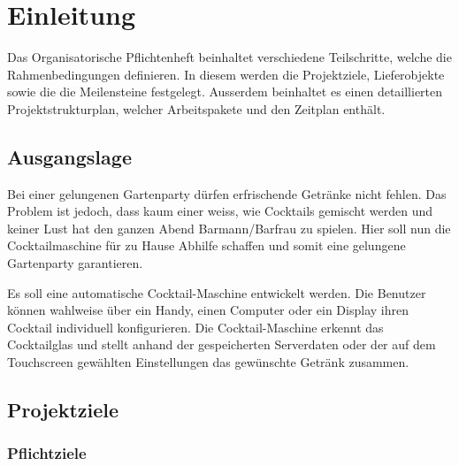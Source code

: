 \clearpage
\section{Einleitung}\label{sec:Einleitung}
Das Organisatorische Pflichtenheft beinhaltet verschiedene Teilschritte, welche die Rahmenbedingungen definieren. In diesem werden die Projektziele, Lieferobjekte sowie die die Meilensteine festgelegt. Ausserdem beinhaltet es einen detaillierten Projektstrukturplan, welcher Arbeitspakete und den Zeitplan enthält.

\subsection{Ausgangslage}\label{subsec:Ausgangslage}

Bei einer gelungenen Gartenparty dürfen erfrischende Getränke nicht fehlen. Das Problem ist jedoch, dass kaum einer weiss, wie Cocktails gemischt werden und keiner Lust hat den ganzen Abend Barmann/Barfrau zu spielen. Hier soll nun die Cocktailmaschine für zu Hause Abhilfe schaffen und somit eine gelungene Gartenparty garantieren.

Es soll eine automatische Cocktail-Maschine entwickelt werden. Die Benutzer können wahlweise über ein Handy, einen Computer oder ein Display ihren Cocktail individuell konfigurieren. Die Cocktail-Maschine erkennt das Cocktailglas und stellt anhand der gespeicherten Serverdaten oder der auf dem Touchscreen gewählten Einstellungen das gewünschte Getränk zusammen. 
 
\newpage
\subsection{Projektziele}\label{subsec:Projektziele}

\subsubsection{Pflichtziele}\label{sec:Pflichtziele}

